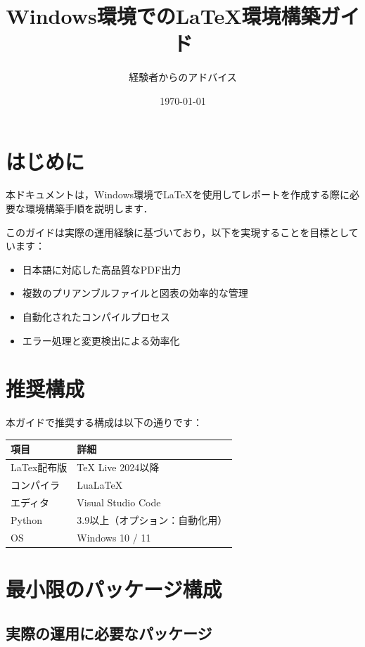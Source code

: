 \documentclass[11pt]{ltjarticle}
\title{Windows環境でのLaTeX環境構築ガイド}
\author{経験者からのアドバイス}
\date{\today}
\begin{document}
\maketitle

\tableofcontents

\newpage

\section{はじめに}

本ドキュメントは，Windows環境でLaTeXを使用してレポートを作成する際に必要な環境構築手順を説明します．

このガイドは実際の運用経験に基づいており，以下を実現することを目標としています：

\begin{itemize}
  \item 日本語に対応した高品質なPDF出力
  \item 複数のプリアンブルファイルと図表の効率的な管理
  \item 自動化されたコンパイルプロセス
  \item エラー処理と変更検出による効率化
\end{itemize}

\section{推奨構成}

本ガイドで推奨する構成は以下の通りです：

\begin{center}
\begin{tabular}{ll}
\hline
\textbf{項目} & \textbf{詳細} \\
\hline
LaTex配布版 & TeX Live 2024以降 \\
コンパイラ & LuaLaTeX \\
エディタ & Visual Studio Code \\
Python & 3.9以上（オプション：自動化用） \\
OS & Windows 10 / 11 \\
\hline
\end{tabular}
\end{center}

\section{最小限のパッケージ構成}

\subsection{実際の運用に必要なパッケージ}
\end{document}
